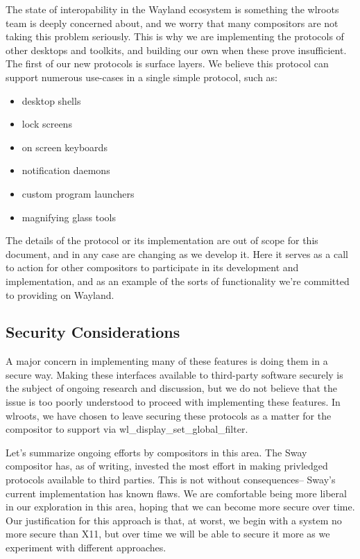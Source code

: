 \documentclass{article}
\begin{document}
The state of interopability in the Wayland ecosystem is something the wlroots
team is deeply concerned about, and we worry that many compositors are not
taking this problem seriously. This is why we are implementing the protocols of
other desktops and toolkits, and building our own when these prove insufficient.
The first of our new protocols is surface layers. We believe this protocol can
support numerous use-cases in a single simple protocol, such as:

\begin{itemize}
    \item desktop shells
    \item lock screens
    \item on screen keyboards
    \item notification daemons
    \item custom program launchers
    \item magnifying glass tools
\end{itemize}

The details of the protocol or its implementation are out of scope for this
document, and in any case are changing as we develop it. Here it serves as a
call to action for other compositors to participate in its development and
implementation, and as an example of the sorts of functionality we're committed
to providing on Wayland.

\subsection{Security Considerations}

A major concern in implementing many of these features is doing them in a
secure way. Making these interfaces available to third-party software securely
is the subject of ongoing research and discussion, but we do not believe that
the issue is too poorly understood to proceed with implementing these features.
In wlroots, we have chosen to leave securing these protocols as a matter for the
compositor to support via wl_display_set_global_filter.

Let's summarize ongoing efforts by compositors in this area. The Sway compositor
has, as of writing, invested the most effort in making privledged protocols
available to third parties. This is not without consequences-- Sway's current
implementation has known flaws. We are comfortable being more liberal in our
exploration in this area, hoping that we can become more secure over time. Our
justification for this approach is that, at worst, we begin with a system no
more secure than X11, but over time we will be able to secure it more as we
experiment with different approaches.
\end{document}
